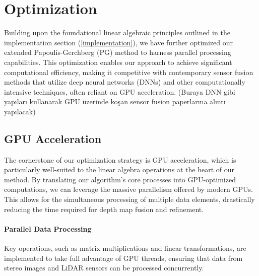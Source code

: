 \documentclass[conference]{IEEEtran}
\begin{document}


\section{Optimization}

Building upon the foundational linear algebraic principles outlined in the implementation section (\ref{implementation}), we have further optimized our extended Papoulis-Gerchberg (PG) method to harness parallel processing capabilities. This optimization enables our approach to achieve significant computational efficiency, making it competitive with contemporary sensor fusion methods that utilize deep neural networks (DNNs) and other computationally intensive techniques, often reliant on GPU acceleration.
(Buraya DNN gibi yapıları kullanarak GPU üzerinde koşan sensor fusion paperlarına alıntı yapılacak)

\subsection{GPU Acceleration}

The cornerstone of our optimization strategy is GPU acceleration, which is particularly well-suited to the linear algebra operations at the heart of our method. By translating our algorithm's core processes into GPU-optimized computations, we can leverage the massive parallelism offered by modern GPUs. This allows for the simultaneous processing of multiple data elements, drastically reducing the time required for depth map fusion and refinement.

\paragraph{Parallel Data Processing} Key operations, such as matrix multiplications and linear transformations, are implemented to take full advantage of GPU threads, ensuring that data from stereo images and LiDAR sensors can be processed concurrently.
\end{document}
